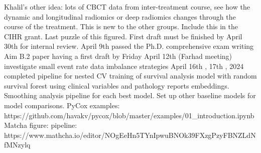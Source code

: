 \documentclass{article}%
\begin{document}
\newline%
\newline%
%
Khalil’s other idea: lots of CBCT data from inter{-}treatment course, see how the dynamic and longitudinal radiomics or deep radiomics changes through the course of the treatment. This is new to the other groups. Include this in the CIHR grant. %
\newline%
\newline%
%
Last puzzle of this figured.%
\newline%
\newline%
%
First draft must be finished by April 30th for internal review. %
\newline%
\newline%
%
%
\newline%
\newline%
%
April 9th %
\newline%
\newline%
%
passed the Ph.D. comprehensive exam %
\newline%
\newline%
%
writing Aim B.2 paper having a first draft by Friday April 12th (Farhad meeting) %
\newline%
\newline%
%
investigate small event rate data imbalance strategies %
\newline%
\newline%
%
%
\newline%
\newline%
%
April 16th , 17th , 2024 %
\newline%
\newline%
%
completed pipeline for nested CV training of survival analysis model with random survival forest using clinical variables and pathology reports embeddings. %
\newline%
\newline%
%
Smoothing analysis pipeline for each best model. %
\newline%
\newline%
%
Set up other baseline models for model comparisons. %
\newline%
\newline%
%
PyCox examples: https://github.com/havakv/pycox/blob/master/examples/01\_introduction.ipynb %
\newline%
\newline%
%
Matcha figure: pipeline: https://www.mathcha.io/editor/NOgEeHn5TYnIpwuBNOk39FXzgPzyFBNZLdNfMNzylq %
\newline%
\end{document}
